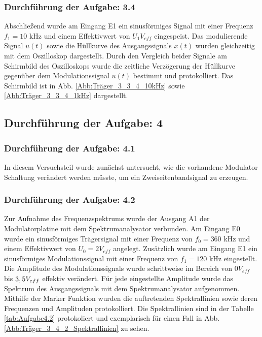 \documentclass[12pt]{scrartcl}
\begin{document}
\subsubsection*{Durchführung der Aufgabe: 3.4}
Abschließend wurde am Eingang E1 ein sinusförmiges Signal mit einer Frequenz $ f_1 = 10$ kHz und einem Effektivwert von $U_1 V_{eff}$ eingespeist. Das modulierende Signal $u(t)$ sowie
 die Hüllkurve des Ausgangssignals $x(t)$ wurden gleichzeitig mit dem Oszilloskop dargestellt.
Durch den Vergleich beider Signale am Schirmbild des Oszilloskops wurde die zeitliche Verzögerung der Hüllkurve gegenüber dem Modulationssignal $u(t)$ bestimmt und protokolliert. Das 
Schirmbild ist in Abb. \ref{Abb:Träger_3_3_4_10kHz} sowie \ref{Abb:Träger_3_3_4_1kHz} dargestellt. 


\newpage
\subsection{Durchführung der Aufgabe: 4}
\subsubsection*{Durchführung der Aufgabe: 4.1}
In diesem Versuchsteil wurde zunächst untersucht, wie die vorhandene Modulator Schaltung verändert werden müsste, um ein Zweiseitenbandsignal  zu erzeugen. 

\subsubsection*{Durchführung der Aufgabe: 4.2}
Zur Aufnahme des Frequenzspektrums wurde der Ausgang A1 der Modulatorplatine mit dem Spektrumanalysator verbunden. Am Eingang E0 wurde ein sinusförmiges Trägersignal mit einer Frequenz
 von $f_0 = 360$ kHz und einem Effektivwert von $U_0= 2 V_{eff}$ angelegt. Zusätzlich wurde am Eingang E1 ein sinusförmiges Modulationssignal mit einer Frequenz von $f_1=120$ kHz eingestellt.\\

Die Amplitude des Modulationssignals wurde schrittweise im Bereich von $0 V_{eff}$ bis $3,5 \text{$ V_{eff}$}$ effektiv verändert. Für jede eingestellte Amplitude wurde das Spektrum des Ausgangssignals 
mit dem Spektrumanalysator aufgenommen. Mithilfe der Marker Funktion wurden die auftretenden Spektrallinien sowie deren Frequenzen und Amplituden  protokolliert. Die Spektrallinien sind in der 
Tabelle \ref{tab:Aufgabe4.2} protokoliert und exemplarisch für einen Fall in Abb. \ref{Abb:Träger_3_4_2_Spektrallinien} zu sehen. 
\end{document}
